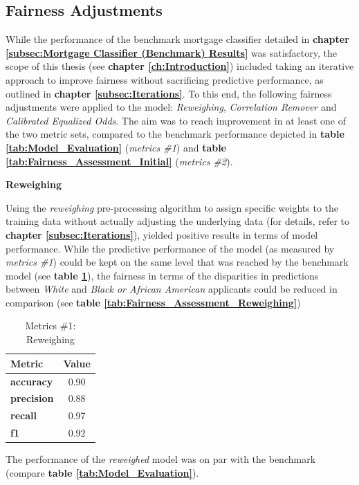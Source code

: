 \subsection{Fairness Adjustments}\label{Fairness Adjustments Results}

While the performance of the benchmark mortgage classifier detailed in \textbf{chapter \ref{subsec:Mortgage Classifier (Benchmark) Results}} was satisfactory, the scope of this thesis (see \textbf{chapter \ref{ch:Introduction}}) included taking an iterative approach to improve fairness without sacrificing predictive performance, as outlined in \textbf{chapter \ref{subsec:Iterations}}.
To this end, the following fairness adjustments were applied to the model: \textit{Reweighing}, \textit{Correlation Remover} and \textit{Calibrated Equalized Odds}. The aim was to reach improvement in at least one of the two metric sets, compared to the benchmark performance depicted in \textbf{table \ref{tab:Model_Evaluation}} (\textit{metrics \#1}) and \textbf{table \ref{tab:Fairness_Assessment_Initial}} (\textit{metrics \#2}).

\textbf{Reweighing}

Using the \textit{reweighing} pre-processing algorithm to assign specific weights to the training data without actually adjusting the underlying data (for details, refer to \textbf{chapter \ref{subsec:Iterations}}), yielded positive results in terms of model performance.
While the predictive performance of the model (as measured by \textit{metrics \#1}) could be kept on the same level that was reached by the benchmark model (see \textbf{table \ref{tab:Model_Evaluation_Reweighing}}), the fairness in terms of the disparities in predictions between \textit{White} and \textit{Black or African American} applicants could be reduced in comparison (see \textbf{table \ref{tab:Fairness_Assessment_Reweighing}})

\begin{table}[!htbp]
    \centering
    \begin{tabular}{l c}
    \toprule
    \textbf{Metric} & \textbf{Value} \\
    \midrule
    \textbf{accuracy} & 0.90 \\
    \textbf{precision} & 0.88 \\
    \textbf{recall} & 0.97 \\
    \textbf{f1} & 0.92 \\
    \bottomrule
    \end{tabular}
    \caption{Metrics \#1: Reweighing}
    \small
    The performance of the \textit{reweighed} model was on par with the benchmark (compare \textbf{table \ref{tab:Model_Evaluation}}).
    \label{tab:Model_Evaluation_Reweighing}
\end{table}

